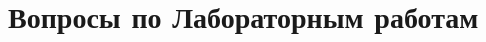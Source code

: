 \documentclass[12pt]{article}
\begin{document}
 
\section*{Вопросы по Лабораторным работам}

\end{document}
